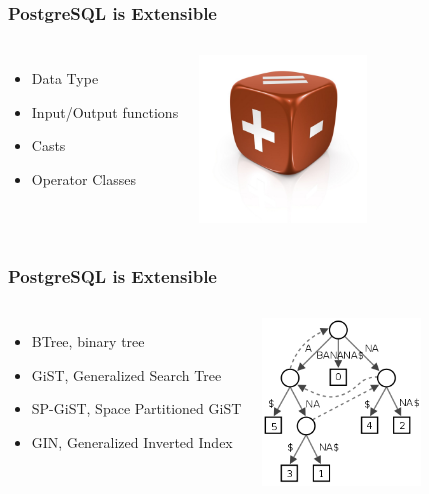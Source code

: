 \documentclass{beamer}
\begin{document}
\begin{frame}[fragile]
  \frametitle{PostgreSQL is Extensible}

  \vfill

\begin{columns}[c]

  \begin{itemize}
  \item Data Type
  \item Input/Output functions
  \item Casts
  \item Operator Classes
  \end{itemize}

\begin{center}
  \includegraphics[height=12em]{plus-equal-sign-1024x1024.jpg}
\end{center}
\end{columns}
\end{frame}

\begin{frame}[fragile]
  \frametitle{PostgreSQL is Extensible}

  \vfill

\begin{columns}[c]

  \begin{itemize}
  \item BTree, binary tree
  \item GiST, Generalized Search Tree
  \item SP-GiST, Space Partitioned GiST
  \item GIN, Generalized Inverted Index
  \end{itemize}

\begin{center}
  \includegraphics[height=12em]{suffix-tree-banana.png}
\end{center}
\end{columns}
\end{frame}
\end{document}
